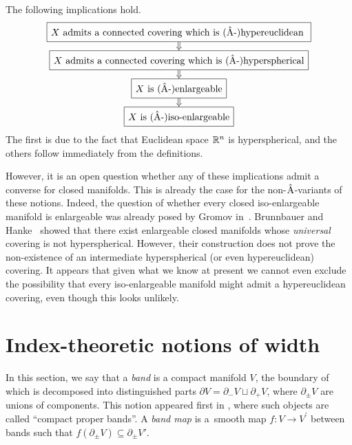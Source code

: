 \documentclass[pdftex]{sigma}
\numberwithin{equation}{section}
\begin{document}
The following implications hold.
\begin{equation}\label{eq:largeness-implications}
\begin{tikzcd}[cells={nodes={draw=black, rectangle,anchor=center,minimum height=2em}}, row sep=small]
 \text{\(X\) admits a connected covering which is (\(\Ahat\)-)hypereuclidean } \dar[Rightarrow]\\
 \text{\(X\) admits a connected covering which is (\(\Ahat\)-)hyperspherical} \dar[Rightarrow]\\
 \text{\(X\) is (\(\Ahat\)-)enlargeable}\dar[Rightarrow] \\
 \text{\(X\) is (\(\Ahat\)-)iso-enlargeable}
\end{tikzcd}
\end{equation}
The first is due to the fact that Euclidean space \(\mathbb{R}^n\) is hyperspherical, and the others follow immediately from the definitions.

However, it is an open question whether any of these implications admit a converse for closed manifolds.
This is already the case for the non-\(\hat{\mathrm{A}}\)-variants of these notions.
Indeed, the question of whether every closed iso-enlargeable manifold is enlargeable was already posed by Gromov in~\cite[p.~659]{Gromov:MetricInequalitiesScalar}.
Brunnbauer and Hanke~\cite[Theorem~1.4]{BrunnbauerHanke} showed that there exist enlargeable closed manifolds whose \emph{universal} covering is not hyperspherical.
However, their construction does not prove the non-existence of an intermediate hyperspherical (or even hypereuclidean) covering.
It appears that given what we know at present we cannot even exclude the possibility that every iso-enlargeable manifold might admit a hypereuclidean covering, even though this looks unlikely.

\section{Index-theoretic notions of width} \label{sec:KO-width}
In this section, we say that a \emph{band} is a compact manifold \(V\), the boundary of which is decomposed into distinguished parts \(\partial V = \partial_- V \sqcup \partial_+ V\), where \(\partial_\pm V\) are unions of components.
This notion appeared first in \cite{Gromov:MetricInequalitiesScalar}, where such objects are called ``compact proper bands''.
A \emph{band map} is a~smooth map \(f \colon V \to V^\prime\) between bands such that \(f(\partial_\pm V) \subseteq  \partial_\pm V'\).
\end{document}
